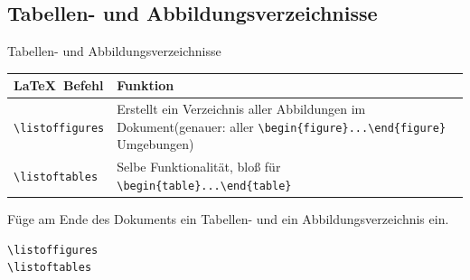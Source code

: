\documentclass["WS\space 16-17\space -\space LaTeX-Kurs\space -\space Praesentation\space -\space 2.tex"]{subfiles}
\begin{document}
\subsection{Tabellen- und Abbildungsverzeichnisse}
\begin{frame}[c]
	\begin{center}
		\large Tabellen- und Abbildungsverzeichnisse
	\end{center}
\end{frame}
\begin{frame}[fragile]
	\begin{center}
		\begin{tabular}{lp{8cm}}
			\toprule
			\LaTeX\ Befehl					&	Funktion								\\ \midrule
			\lstinline|\listoffigures|		&	Erstellt ein Verzeichnis aller Abbildungen im Dokument\newline(genauer: aller \lstinline[basicstyle=\normalsize\normalfont]|\begin{figure}...\end{figure}| Umgebungen)		\\
			\lstinline|\listoftables|		&	Selbe Funktionalität, bloß für \lstinline[basicstyle=\normalsize\normalfont]|\begin{table}...\end{table}|			\\
			\bottomrule
		\end{tabular}
	\end{center}
	
	\pause\btVFill
	\begin{Aufgabe}
		Füge am Ende des Dokuments ein Tabellen- und ein Abbildungsverzeichnis ein.
	\end{Aufgabe}
	\vspace{0.3cm}
\end{frame}
\begin{frame}[fragile]
	\Code
	\begin{lstlisting}
\listoffigures
\listoftables
	\end{lstlisting}
\end{frame}
\end{document}
